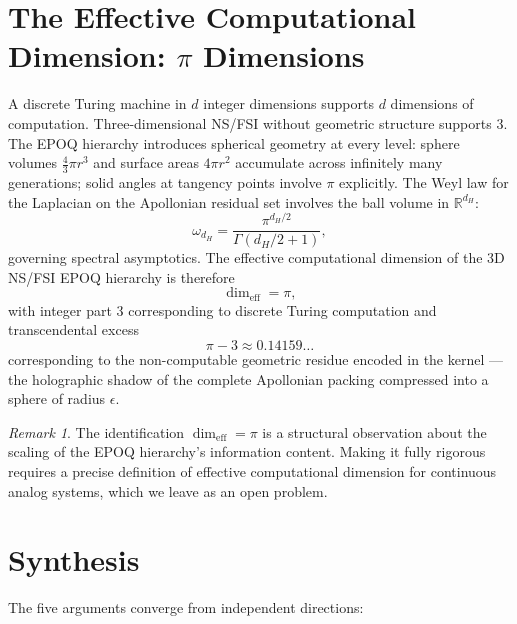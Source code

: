 \documentclass[11pt]{article}
\theoremstyle{plain}
\theoremstyle{definition}
\theoremstyle{remark}
\newtheorem{remark}{Remark}
\begin{document}
\section{The Effective Computational Dimension: $\pi$ Dimensions}
\label{sec:pi}

A discrete Turing machine in $d$ integer dimensions supports $d$ dimensions
of computation. Three-dimensional NS/FSI without geometric structure supports
$3$. The EPOQ hierarchy introduces spherical geometry at every level: sphere
volumes $\frac{4}{3}\pi r^3$ and surface areas $4\pi r^2$ accumulate across
infinitely many generations; solid angles at tangency points involve $\pi$
explicitly. The Weyl law for the Laplacian on the Apollonian residual set
involves the ball volume in $\mathbb{R}^{d_H}$:
\[
  \omega_{d_H} = \frac{\pi^{d_H/2}}{\Gamma(d_H/2+1)},
\]
governing spectral asymptotics. The effective computational dimension of
the 3D NS/FSI EPOQ hierarchy is therefore
\[
  \dim_{\mathrm{eff}} = \pi,
\]
with integer part $3$ corresponding to discrete Turing computation and
transcendental excess
\[
  \pi - 3 \approx 0.14159\ldots
\]
corresponding to the non-computable geometric residue encoded in the kernel
--- the holographic shadow of the complete Apollonian packing compressed into
a sphere of radius $\epsilon$.

\begin{remark}
The identification $\dim_{\mathrm{eff}} = \pi$ is a structural observation
about the scaling of the EPOQ hierarchy's information content. Making it
fully rigorous requires a precise definition of effective computational
dimension for continuous analog systems, which we leave as an open problem.
\end{remark}

\section{Synthesis}
\label{sec:synthesis}

The five arguments converge from independent directions:
\end{document}
